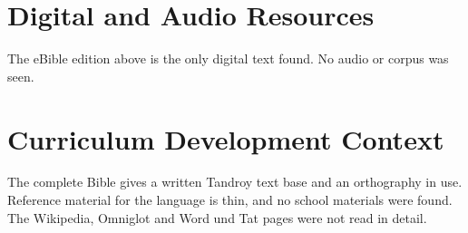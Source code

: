 \documentclass[12pt]{article}
\begin{document}
\section{Digital and Audio Resources}
The eBible edition above is the only digital text found. No audio or corpus was seen.

\section{Curriculum Development Context}
The complete Bible gives a written Tandroy text base and an orthography in use. Reference material for the language is thin, and no school materials were found. The Wikipedia, Omniglot and Word und Tat pages were not read in detail.
\end{document}
